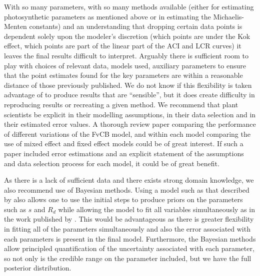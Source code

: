 \documentclass[11pt]{article} %
\begin{document}
With so many parameters, with so many methods available (either for estimating photosynthetic parameters as mentioned above or in estimating the Michaelis-Menten constants) and an understanding that dropping certain data points is dependent solely upon the modeler's discretion (which points are under the Kok effect, which points are part of the linear part of the ACI and LCR curves) it leaves the final results difficult to interpret. Arguably there is sufficient room to play with choices of relevant data, models used, auxiliary parameters to ensure that the point estimates found for the key parameters are within a reasonable distance of those previously published. We do not know if this flexibility is taken advantage of to produce results that are ``sensible'', but it does create difficulty in reproducing results or recreating a given method. We recommend that plant scientists be explicit in their modelling assumptions, in their data selection and in their estimated error values. A thorough review paper comparing the performance of different variations of the FvCB model, and within each model comparing the use of mixed effect and fixed effect models could be of great interest. If such a paper included error estimations and an explicit statement of the assumptions and data selection process for each model, it could be of great benefit.

As there is a lack of sufficient data and there exists strong domain knowledge, we also recommend use of Bayesian methods. Using a model such as that described by \citet{YinUsingcombinedmeasurements2009} also allows one to use the initial steps to produce priors on the parameters such as $s$ and $R_d$ while allowing the model to fit all variables simultaneously as in the work published by \citet{QianEstimationphotosynthesisparameters2012}. This would be advantageous as there is greater flexibility in fitting all of the parameters simultaneously and also the error associated with each parameters is present in the final model. Furthermore, the Bayesian methods allow principled quantification of the uncertainty associated with each parameter, so not only is the credible range on the parameter included, but we have the full posterior distribution.

\end{document}
